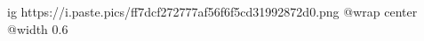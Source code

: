  
 
 
 
 

\ifcmt
	ig https://i.paste.pics/ff7dcf272777af56f6f5cd31992872d0.png
  @wrap center
  @width 0.6
\fi
